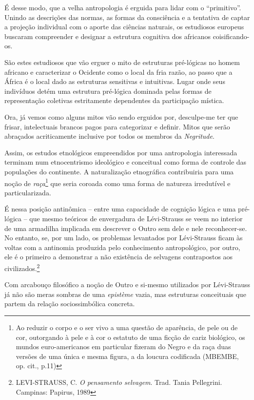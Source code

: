 É desse modo, que a velha antropologia é erguida para lidar com o
``primitivo''. Unindo as descrições das normas, as formas da consciência
e a tentativa de captar a projeção individual com o aporte das ciências
naturais, os estudiosos europeus buscaram compreender e designar a
estrutura cognitiva dos africanos coisificando-os.

São estes estudiosos que vão erguer o mito de estruturas pré-lógicas no
homem africano e caracterizar o Ocidente como o local da fria razão, ao
passo que a África é o local dado as estruturas sensitivas e intuitivas.
Lugar onde seus indivíduos detém uma estrutura pré-lógica dominada pelas
formas de representação coletivas estritamente dependentes da
participação mística.

Ora, já vemos como alguns mitos vão sendo erguidos por, desculpe-me ter
que frisar, intelectuais brancos pagos para categorizar e definir. Mitos
que serão abraçados acriticamente inclusive por todos os membros da
\emph{Negritude}.

Assim, os estudos etnológicos empreendidos por uma antropologia
interessada terminam num etnocentrismo ideológico e conceitual como
forma de controle das populações do continente. A naturalização
etnográfica contribuiria para uma noção de \emph{raça}\footnote{Ao
  reduzir o corpo e o ser vivo a uma questão de aparência, de pele ou de
  cor, outorgando à pele e à cor o estatuto de uma ficção de cariz
  biológico, os mundos euro-americanos em particular fizeram do Negro e
  da raça duas versões de uma única e mesma figura, a da loucura
  codificada (MBEMBE, op. cit., p.11)} que seria coroada como uma forma
de natureza irredutível e particularizada.

É nessa posição antinômica -- entre uma capacidade de cognição lógica e
uma pré-lógica -- que mesmo teóricos de envergadura de Lévi-Strauss se
veem no interior de uma armadilha implicada em descrever o Outro sem
dele e nele reconhecer-se. No entanto, se, por um lado, os problemas
levantados por Lévi-Strauss ficam às voltas com a antinomia produzida
pelo conhecimento antropológico, por outro, ele é o primeiro a
demonstrar a não existência de selvagens contrapostos aos
civilizados.\footnote{LEVI-STRAUSS, C. \emph{O pensamento selvagem}.
  Trad. Tania Pellegrini. Campinas: Papirus, 1989}

Com arcabouço filosófico a noção de Outro e si-mesmo utilizados por
Lévi-Strauss já não são meras sombras de uma \emph{epistème} vazia, mas
estruturas conceituais que partem da relação sociossimbólica concreta.


